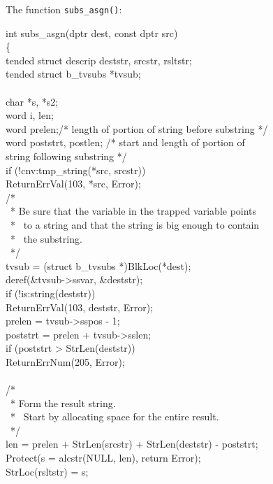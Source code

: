 The function \texttt{subs\_asgn()}:

\begin{iconcode}
int subs\_asgn(dptr dest, const dptr src)\\
\>\{\\
\>tended struct descrip deststr, srcstr, rsltstr;\\
\>tended struct b\_tvsubs *tvsub;\\
\\
\>char *s, *s2;\\
\>word i, len;\\
\>word prelen;/* length of portion of string before substring */\\
\>word poststrt, postlen; /* start and length of portion of\\
\>\>\>\>\>\>\>\>\>\>string following substring */\\
\>if (!cnv:tmp\_string(*src, srcstr))\\
\>\>ReturnErrVal(103, *src, Error);\\
\>/*\\
\>\ * Be sure that the variable in the trapped variable points\\
\>\ * \ to a string and that the string is big enough to contain\\
\>\ * \ the substring.\\
\>\ */\\
\>tvsub = (struct b\_tvsubs *)BlkLoc(*dest);\\
\>deref(\&tvsub->ssvar, \&deststr);\\
\>if (!is:string(deststr))\\
\>\>ReturnErrVal(103, deststr, Error);\\
\>prelen = tvsub->sspos - 1;\\
\>poststrt = prelen + tvsub->sslen;\\
\>if (poststrt > StrLen(deststr))\\
\>\>ReturnErrNum(205, Error);\\
\\
\>/*\\
\>\ * Form the result string.\\
\>\ * \ Start by allocating space for the entire result.\\
\>\ */\\
\>len = prelen + StrLen(srcstr) + StrLen(deststr) - poststrt;\\
\>Protect(s = alcstr(NULL, len), return Error);\\
\>StrLoc(rsltstr) = s;\\

\end{iconcode}
